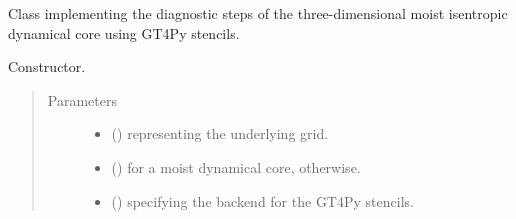 \documentclass[letterpaper,10pt,english]{sphinxmanual}
\begin{document}
\begin{fulllineitems}
\label{\detokenize{api:tasmania.dycore.diagnostic_isentropic.DiagnosticIsentropic}}
Class implementing the diagnostic steps of the three-dimensional moist isentropic dynamical core
using GT4Py stencils.

\begin{fulllineitems}
\label{\detokenize{api:tasmania.dycore.diagnostic_isentropic.DiagnosticIsentropic.__init__}}
Constructor.
\begin{quote}\begin{description}
\item[{Parameters}] \leavevmode\begin{itemize}
\item {} 
 () \textendash{} {\hyperref[\detokenize{api:tasmania.grids.grid_xyz.GridXYZ}]{}} representing the underlying grid.

\item {} 
 () \textendash{}  for a moist dynamical core,  otherwise.

\item {} 
 () \textendash{}  specifying the backend for the GT4Py stencils.

\end{itemize}

\end{description}\end{quote}

\end{fulllineitems}



\end{fulllineitems}
\end{document}
